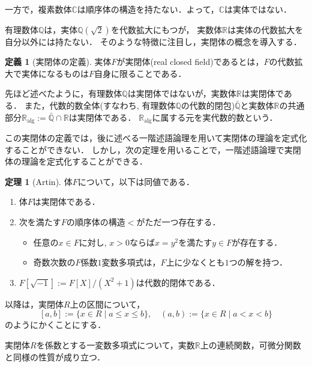 \documentclass[uplatex, dvipdfmx]{jsarticle}
\newcommand{\R}{\mathbb{R}}
\newcommand{\Q}{\mathbb{Q}}
\newcommand{\C}{\mathbb{C}}
\newcommand{\Ralg}{\mathbb{R}_\mathrm{alg}}
\theoremstyle{definition}
\newtheorem{definition}{定義}[section]
\newtheorem{theorem}{定理}[section]
\begin{document}
一方で，複素数体$\C$は順序体の構造を持たない．よって，$\C$は実体ではない．

有理数体$\Q$は，実体$\Q(\sqrt{2})$を代数拡大にもつが，
実数体$\R$は実体の代数拡大を自分以外には持たない．
そのような特徴に注目し，実閉体の概念を導入する．

\begin{definition}[実閉体の定義]
     実体$F$が実閉体(real closed field)であるとは，$F$の代数拡大で実体になるものは$F$自身に限ることである．
\end{definition}

先ほど述べたように，有理数体$\Q$は実閉体ではないが，実数体$\R$は実閉体である．
また，代数的数全体(すなわち, 有理数体$\Q$の代数的閉包)$\bar{\Q}$と実数体$\R$の共通部分$\Ralg := \bar{\Q} \cap \R$は実閉体である．
$\Ralg$に属する元を実代数的数という．

この実閉体の定義では，後に述べる一階述語論理を用いて実閉体の理論を定式化することができない．
しかし，次の定理を用いることで，一階述語論理で実閉体の理論を定式化することができる．

\begin{theorem}[Artin]
     体$F$について，以下は同値である．
     \begin{enumerate}
          \item 体$F$は実閉体である．\label{proposition:rcf_1}
          \item 次を満たす$F$の順序体の構造$<$がただ一つ存在する．
               \begin{itemize}
                    \item 任意の$x \in F$に対し, $x>0$ならば$x = y^2$を満たす$y \in F$が存在する．
                    \item 奇数次数の$F$係数$1$変数多項式は，$F$上に少なくとも$1$つの解を持つ．
               \end{itemize}
          \item $F[\sqrt{-1}] := F[X]/(X^2 + 1)$は代数的閉体である．\label{proposition:rcf_2}
     \end{enumerate}
\end{theorem}

以降は，実閉体$R$上の区間について，
\[
     [a,b]:=\{x \in R \mid a \leq x \leq b\}, \quad (a,b):=\{x \in R \mid a < x < b\}
\]
のようにかくことにする．

実閉体$R$を係数とする一変数多項式について，実数$\R$上の連続関数，可微分関数と同様の性質が成り立つ．
\end{document}
